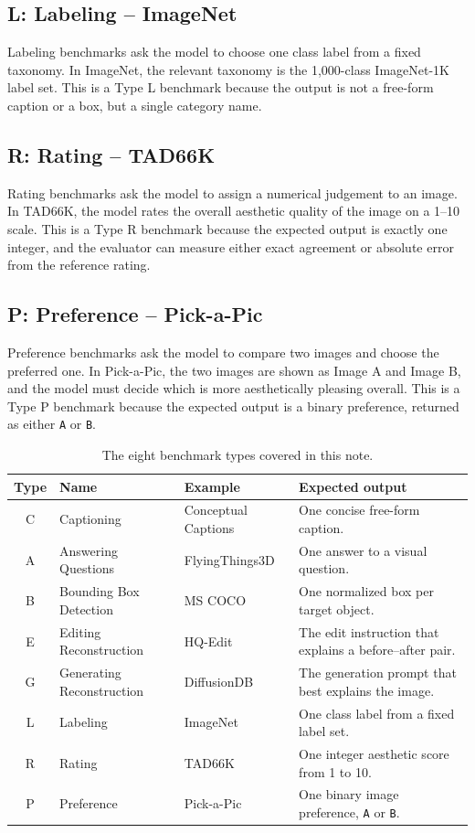 \documentclass[11pt,a4paper]{article}
\newcommand{\code}[1]{\texttt{#1}}
\begin{document}
\subsection*{L: Labeling -- ImageNet}

Labeling benchmarks ask the model to choose one class label from a fixed
taxonomy. In ImageNet, the relevant taxonomy is the 1,000-class ImageNet-1K
label set. This is a Type L benchmark because the output is not a free-form
caption or a box, but a single category name.

\subsection*{R: Rating -- TAD66K}

Rating benchmarks ask the model to assign a numerical judgement to an image.
In TAD66K, the model rates the overall aesthetic quality of the image on a
1--10 scale. This is a Type R benchmark because the expected output is exactly
one integer, and the evaluator can measure either exact agreement or absolute
error from the reference rating.

\subsection*{P: Preference -- Pick-a-Pic}

Preference benchmarks ask the model to compare two images and choose the
preferred one. In Pick-a-Pic, the two images are shown as Image A and Image B,
and the model must decide which is more aesthetically pleasing overall. This is
a Type P benchmark because the expected output is a binary preference, returned
as either \code{A} or \code{B}.



\begin{table}[H]
\centering
\small
\caption{The eight benchmark types covered in this note.}
\begin{tabularx}{\textwidth}{@{}clXX@{}}
\toprule
\textbf{Type} & \textbf{Name} & \textbf{Example} & \textbf{Expected output} \\
\midrule
C & Captioning & Conceptual Captions & One concise free-form caption. \\
A & Answering Questions & FlyingThings3D & One answer to a visual question. \\
B & Bounding Box Detection & MS COCO & One normalized box per target object. \\
E & Editing Reconstruction & HQ-Edit & The edit instruction that explains a before--after pair. \\
G & Generating Reconstruction & DiffusionDB & The generation prompt that best explains the image. \\
L & Labeling & ImageNet & One class label from a fixed label set. \\
R & Rating & TAD66K & One integer aesthetic score from 1 to 10. \\
P & Preference & Pick-a-Pic & One binary image preference, \code{A} or \code{B}. \\
\bottomrule
\end{tabularx}
\end{table}
\end{document}
